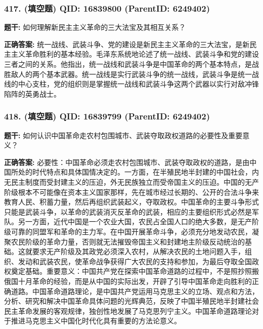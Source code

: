 \documentclass[12pt,UTF8]{ctexart}
\begin{document}
\subsubsection*{417. (填空题) \small QID: 16839800 (ParentID: 6249402)}

\textbf{题干:}
如何理解新民主主义革命的三大法宝及其相互关系？



\textbf{正确答案:}
统一战线、武装斗争、党的建设是新民主主义革命的三大法宝，是新民主主义革命胜利的基本经验。毛泽东系统地论述了统一战线、武装斗争和党的建设三者之间的关系。他指出，统一战线和武装斗争是中国革命的两个基本特点，是战胜敌人的两个基本武器。统一战线是实行武装斗争的统一战线，武装斗争是统一战线的中心支柱，党的组织则是掌握统一战线和武装斗争这两个武器以实行对敌冲锋陷阵的英勇战士。

\vspace{0.3em}\hrulefill\vspace{0.7em}

\subsubsection*{418. (填空题) \small QID: 16839799 (ParentID: 6249402)}

\textbf{题干:}
如何认识中国革命走农村包围城市、武装夺取政权道路的必要性及重要意义？



\textbf{正确答案:}
必要性：中国革命必须走农村包围城市、武装夺取政权的道路，是由中国所处的时代特点和具体国情决定的。一方面，在半殖民地半封建的中国社会，内无民主制度而受封建主义的压迫，外无民族独立而受帝国主义的压迫。中国的无产阶级根本不可能像在资本主义国家那样，先在城市经过长期的、公开的合法斗争来教育人民、积蓄力量，然后再组织武装起义，夺取政权。中国革命的主要斗争形式只能是武装斗争，以革命的武装消灭反革命的武装，相应的主要组织形式必然是军队。另一方面，近代中国是一个农业大国，农民占全国人口的绝大多数，是无产阶级可靠的同盟军和革命的主力军。在中国开展革命斗争，必须充分地发动农民，凝聚农民阶级的革命力量，否则就无法摧毁帝国主义和封建地主阶级反动统治的基础。这就要求无产阶级及其政党必须深入农村，从解决农民的土地问题入手，组织、发动和武装农民，使革命战争获得广大农民的支持和参加，为最后夺取全国政权奠定基础。重要意义：中国共产党在探索中国革命道路的过程中，不是照抄照搬俄国十月革命的经验，而是从中国的实际出发，开辟了引导中国革命走向胜利的正确道路。中国革命道路理论，是中国共产党运用马克思主义的立场、观点和方法，分析、研究和解决中国革命具体问题的光辉典范，反映了中国半殖民地半封建社会民主革命发展的客观规律，独创性地发展了马克思列宁主义。中国革命道路理论对于推进马克思主义中国化时代化具有重要的方法论意义。
\end{document}
